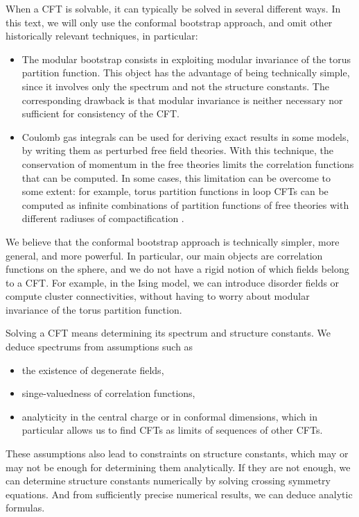 \documentclass[12pt, a4paper]{article}
\begin{document}
When a CFT is solvable, it can typically be solved in several different ways. In this text, we will only use the conformal bootstrap approach, and omit other historically relevant techniques, in particular:
\begin{itemize}
 \item The modular bootstrap consists in exploiting modular invariance of the torus partition function. This object has the advantage of being technically simple, since it involves only the spectrum and not the structure constants. The corresponding drawback is that modular invariance is neither necessary nor sufficient for consistency of the CFT.
 \item Coulomb gas integrals can be used for deriving exact results in some models, by writing them as perturbed free field theories. With this technique, the conservation of momentum in the free theories limits the correlation functions that can be computed. In some cases, this limitation can be overcome to some extent: for example, torus partition functions in loop CFTs can be computed as infinite combinations of partition functions of free theories with different radiuses of compactification \cite{fsz87}.
\end{itemize}
We believe that the conformal bootstrap approach is technically simpler, more general, and more powerful. In particular, our main objects are correlation functions on the sphere, and we do not have a rigid notion of which fields belong to a CFT. For example, in the Ising model, we can introduce disorder fields or compute cluster connectivities, without having to worry about modular invariance of the torus partition function.

Solving a CFT means determining its spectrum and structure constants. We deduce spectrums from assumptions such as 
\begin{itemize}
 \item the existence of degenerate fields,
 \item singe-valuedness of correlation functions,
 \item analyticity in the central charge or in conformal dimensions, which in particular allows us to find CFTs as limits of sequences of other CFTs. 
\end{itemize}
These assumptions also lead to constraints on structure constants, which may or may not be enough for determining them analytically. If they are not enough, we can determine structure constants numerically by solving crossing symmetry equations. And from sufficiently precise numerical results, we can deduce analytic formulas. 
\end{document}
